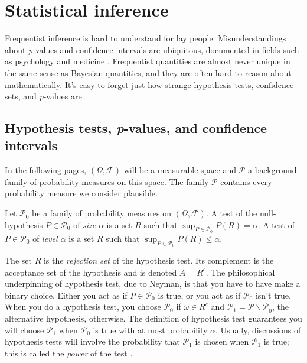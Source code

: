 \section{Statistical inference}

Frequentist inference is hard to understand for lay people. Misunderstandings about \emph{p}-values and confidence intervals are ubiquitous, documented in fields such as psychology \parencite{Belia2005-di,Gigerenzer2018-oi} and medicine \parencite{Goodman2008-ed,Gigerenzer2007-qi}. Frequentist quantities are almost never unique in the same sense as Bayesian quantities, and they are often hard to reason about mathematically. It's easy to forget just how strange hypothesis tests, confidence
sets, and \emph{p}-values are. 

\subsection{Hypothesis tests, \emph{p}-values, and confidence intervals}

In the following pages, $(\Omega,\mathcal{\mathcal{F}})$ will be a measurable space and $\mathcal{P}$ a background family of probability measures on this space. The family $\mathcal{P}$ contains every probability measure we consider plausible. 
\begin{definition}
\parencite[][Chapter 3.1]{Lehmann2005-sp} Let $\mathcal{P}_{0}$ be a family
of probability measures on $(\Omega,\mathcal{F})$. A test of the
null-hypothesis $P\in\mathcal{P}_{0}$ of \emph{size} $\alpha$ is
a set $R$ such that $\sup_{P\in\mathcal{P}_{0}}P(R)=\alpha.$ A test
of $P\in\mathcal{P}_{0}$ of \emph{level $\alpha$ }is a set $R$
such that $\sup_{P\in\mathcal{P}_{0}}P(R)\leq\alpha.$
\end{definition}

The set $R$ is the \emph{rejection set} of the hypothesis test. Its complement is the acceptance set of the hypothesis and is denoted $A=R^{c}$. The philosophical underpinning of hypothesis test, due to Neyman, is that you have to have make a binary choice. Either you act as if $P\in\mathcal{P}_{0}$ is true, or you act as if $\mathcal{P}_{0}$ isn't true. When you do a hypothesis test, you choose $\mathcal{P}_{0}$ if $\omega\in R^{c}$ and $\mathcal{P}_{1}=\mathcal{P\backslash P}_{0}$, the alternative hypothesis, otherwise. The definition of hypothesis test guarantees you will choose $\mathcal{P}_{1}$ when $\mathcal{P}_{0}$ is true with at most probability $\alpha$. Usually, discussions of hypothesis tests will involve the probability that $\mathcal{P}_{1}$ is chosen when $\mathcal{P}_{1}$ is true; this is called the \emph{power} of the test \parencite{Neyman1977-nx}.

